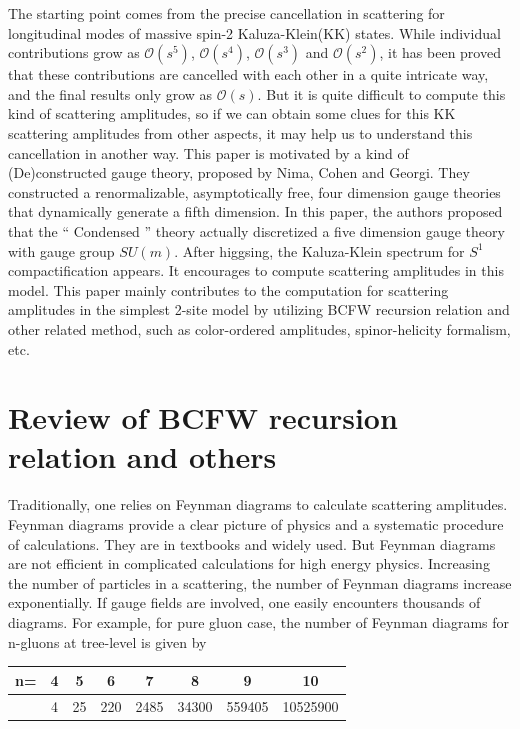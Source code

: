 \documentclass[12pt]{article}
\numberwithin{equation}{section}
\begin{document}
The starting point comes from the precise cancellation in scattering for longitudinal modes of massive spin-2 Kaluza-Klein(KK) states. While individual contributions grow as $\mathcal{O}(s^5)$, $\mathcal{O}(s^4)$, $\mathcal{O}(s^3)$ and $\mathcal{O}(s^2)$, it has been proved that these contributions are cancelled with
each other in a quite intricate way\cite{SekharChivukula:2019yul}, and the final results only grow as $\mathcal{O}(s)$. But it is quite difficult to compute this kind of scattering amplitudes, so if we can obtain some clues for this KK scattering amplitudes from other aspects, it may help us to
understand this cancellation in another way. This paper is motivated by a kind of (De)constructed gauge theory, proposed by Nima, Cohen and Georgi\cite{Arkani-Hamed:2001kyx}. They constructed a renormalizable, asymptotically free, four dimension gauge theories that dynamically generate a fifth dimension. 
In this paper, the authors proposed that the “ Condensed '' theory actually discretized a five dimension gauge theory with gauge group $SU(m)$. After higgsing, the Kaluza-Klein spectrum for $S^1$ compactification appears. It encourages to compute scattering amplitudes in this model. This paper mainly contributes to the 
computation for scattering amplitudes in the simplest 2-site model by utilizing BCFW recursion relation and other related method, such as color-ordered amplitudes, spinor-helicity formalism, etc.

\section{Review of BCFW recursion relation and others}
Traditionally, one relies on Feynman diagrams to calculate scattering amplitudes. Feynman diagrams
provide a clear picture of physics and a systematic procedure of calculations. They are in textbooks
and widely used. But Feynman diagrams are not efficient in complicated calculations for high energy physics. Increasing
the number of particles in a scattering, the number of Feynman diagrams increase exponentially. If gauge
fields are involved, one easily encounters thousands of diagrams. For example, for pure gluon case, the number
of Feynman diagrams for n-gluons at tree-level is given by
\begin{table}[htbp]
    \centering
\begin{tabular}{|c|c|c|c|c|c|c|c|}
    \hline
    n= & 4 & 5 & 6 & 7 & 8 & 9 & 10 \\
    \hline
       & 4 & 25 & 220 & 2485 & 34300 & 559405 & 10525900   \\
    \hline
    \end{tabular}
\end{table}
\end{document}
